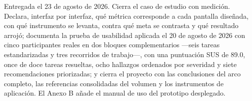 \documentclass[11pt,letterpaper]{article}
\begin{document}
\clearpage


  {Entregada el 23 de agosto de 2026. Cierra el caso de estudio con medición. Declara, interfaz
   por interfaz, qué métrica corresponde a cada pantalla diseñada, con qué instrumento se levanta,
   contra qué meta se contrasta y qué resultado arrojó; documenta la prueba de usabilidad aplicada
   el 20 de agosto de 2026 con cinco participantes reales en dos bloques complementarios ---seis
   tareas estandarizadas y tres recorridos de trabajo---, con una puntuación SUS de 89.0, once de
   doce tareas resueltas, ocho hallazgos ordenados por severidad y siete recomendaciones
   priorizadas; y cierra el proyecto con las conclusiones del arco completo, las referencias
   consolidadas del volumen y los instrumentos de aplicación. El Anexo B añade el manual de uso
   del prototipo desplegado.}






\clearpage

\end{document}

